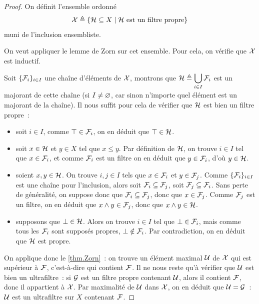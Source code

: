 \begin{proof}
  On définit l'ensemble ordonné
  \[\mathcal{X} \triangleq \left\{ \mathcal{H} \subseteq X \;\middle\vert\; \mathcal{H}
  \text{ est un filtre propre} \right\}\]
  muni de l'inclusion ensembliste.

  On veut appliquer le lemme de Zorn sur cet ensemble. Pour cela, on
  vérifie que $\mathcal{X}$ est inductif.

  Soit $\{\mathcal{F}_i\}_{i\in I}$ une chaîne d'éléments de $\mathcal{X}$,
  montrons que $\mathcal{H} \triangleq \displaystyle\bigcup_{i\in I} \mathcal{F}_i$ est un
  majorant de cette chaîne (si $I \neq \varnothing$, car sinon n'importe quel
  élément est un majorant de la chaîne). Il nous suffit pour cela de vérifier
  que $\mathcal{H}$ est bien un filtre propre~:
  \begin{itemize}
  \item soit $i\in I$, comme $\top \in \mathcal F_i$, on en déduit que
    $\top \in \mathcal{H}$.
  \item soit $x\in \mathcal{H}$ et $y\in X$ tel que $x\leq y$. Par définition
    de $\mathcal{H}$, on trouve $i\in I$ tel que $x\in \mathcal{F}_i$, et comme
    $\mathcal{F}_i$ est un filtre on en déduit que $y\in \mathcal{F}_i$, d'où
    $y\in\mathcal{H}$.
  \item soient $x,y\in \mathcal{H}$. On trouve $i,j\in I$ tels que
    $x\in \mathcal{F}_i$ et $y\in \mathcal{F}_j$. Comme $\{\mathcal{F}_i\}_{i \in I}$ est une
    chaîne pour l'inclusion, alors soit $\mathcal{F}_i \subseteq \mathcal{F}_j$,
    soit $\mathcal{F}_j\subseteq \mathcal{F}_i$. Sans perte de généralité, on
    suppose donc que $\mathcal{F}_i\subseteq \mathcal{F}_j$, donc que
    $x\in \mathcal{F}_j$. Comme $\mathcal{F}_j$ est un filtre, on en déduit que
    $x\wedge y \in \mathcal{F}_j$, donc que $x\wedge y \in \mathcal{H}$.
  \item supposons que $\bot\in \mathcal{H}$. Alors on trouve $i\in I$ tel que
    $\bot\in \mathcal{F}_i$, mais comme tous les $\mathcal{F}_i$ sont supposés
    propres, $\bot\notin\mathcal{F}_i$. Par contradiction, on en déduit que
    $\mathcal{H}$ est propre.
  \end{itemize}

  On applique donc le \cref{thm.Zorn}~: on trouve un élément maximal
  $\mathcal{U}$ de $\mathcal{X}$ qui est supérieur à $\mathcal{F}$, c'est-à-dire
  qui contient $\mathcal{F}$. Il ne nous reste qu'à vérifier que $\mathcal{U}$ est
  bien un ultrafiltre~: si $\mathcal{G}$ est un filtre propre contenant
  $\mathcal{U}$, alors il contient $\mathcal{F}$, donc il appartient à
  $\mathcal{X}$. Par maximalité de $\mathcal{U}$ dans $\mathcal{X}$, on en déduit
  que $\mathcal{U} = \mathcal{G}$~: $\mathcal{U}$ est un ultrafiltre sur $X$
  contenant $\mathcal{F}$.
\end{proof}


